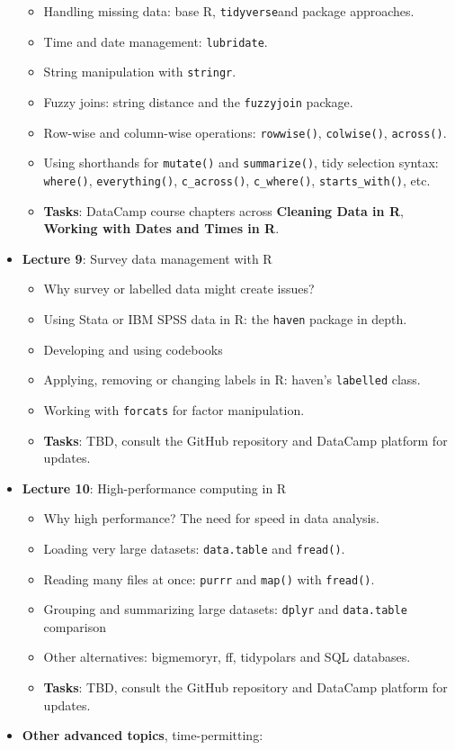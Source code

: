 \documentclass[
  letterpaper,
  DIV=11,
  numbers=noendperiod]{scrartcl}
\providecommand{\tightlist}{%
  \setlength{\itemsep}{0pt}\setlength{\parskip}{0pt}}\usepackage{longtable,booktabs,array}
\begin{document}
\begin{itemize}
  \begin{itemize}
  \tightlist
  \item
    Handling missing data: base R, \texttt{tidyverse}and package
    approaches.
  \item
    Time and date management: \texttt{lubridate}.
  \item
    String manipulation with \texttt{stringr}.
  \item
    Fuzzy joins: string distance and the \texttt{fuzzyjoin} package.
  \item
    Row-wise and column-wise operations: \texttt{rowwise()},
    \texttt{colwise()}, \texttt{across()}.
  \item
    Using shorthands for \texttt{mutate()} and \texttt{summarize()},
    tidy selection syntax: \texttt{where()}, \texttt{everything()},
    \texttt{c\_across()}, \texttt{c\_where()}, \texttt{starts\_with()},
    etc.
  \item
    \textbf{Tasks}: DataCamp course chapters across \textbf{Cleaning
    Data in R}, \textbf{Working with Dates and Times in R}.
  \end{itemize}
\item
  \textbf{Lecture 9}: Survey data management with R

  \begin{itemize}
  \tightlist
  \item
    Why survey or labelled data might create issues?
  \item
    Using Stata or IBM SPSS data in R: the \texttt{haven} package in
    depth.
  \item
    Developing and using codebooks
  \item
    Applying, removing or changing labels in R: haven's
    \texttt{labelled} class.
  \item
    Working with \texttt{forcats} for factor manipulation.
  \item
    \textbf{Tasks}: TBD, consult the GitHub repository and DataCamp
    platform for updates.
  \end{itemize}
\item
  \textbf{Lecture 10}: High-performance computing in R

  \begin{itemize}
  \tightlist
  \item
    Why high performance? The need for speed in data analysis.
  \item
    Loading very large datasets: \texttt{data.table} and
    \texttt{fread()}.
  \item
    Reading many files at once: \texttt{purrr} and \texttt{map()} with
    \texttt{fread()}.
  \item
    Grouping and summarizing large datasets: \texttt{dplyr} and
    \texttt{data.table} comparison
  \item
    Other alternatives: bigmemoryr, ff, tidypolars and SQL databases.
  \item
    \textbf{Tasks}: TBD, consult the GitHub repository and DataCamp
    platform for updates.
  \end{itemize}
\item
  \textbf{Other advanced topics}, time-permitting:


\end{itemize}
\end{document}

